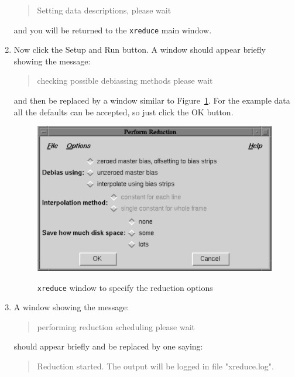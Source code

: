 \documentclass[twoside,11pt]{starlink}
\begin{document}
\begin{enumerate}
  \begin{quote}
   \textsf{Setting data descriptions, please wait}
  \end{quote}

   and you will be returned to the \texttt{xreduce} main window.

  \item Now click the \textsf{Setup and Run} button.  A window should appear
   briefly showing the message:

  \begin{quote}
   \textsf{checking possible debiassing methods please wait}
  \end{quote}

   and then be replaced by a window similar to Figure~\ref{PERFORMREDUCTION}.
   For the example data all the defaults can be accepted, so just click the
   \textsf{OK} button.

  \begin{figure}[htbp]
     \centering
      \includegraphics[totalheight=3in]{sc5_performreduction}
      \begin{quote}
      \caption{\texttt{xreduce} window to specify the reduction options
      \label{PERFORMREDUCTION} }
      \end{quote}
  \end{figure}

  \item A window showing the message:

  \begin{quote}
   \textsf{performing reduction scheduling please wait}
  \end{quote}

   should appear briefly and be replaced by one saying:

  \begin{quote}
   \textsf{Reduction started.  The output will be logged in file
   "xreduce.log".}
  \end{quote}


\end{enumerate}
\end{document}
